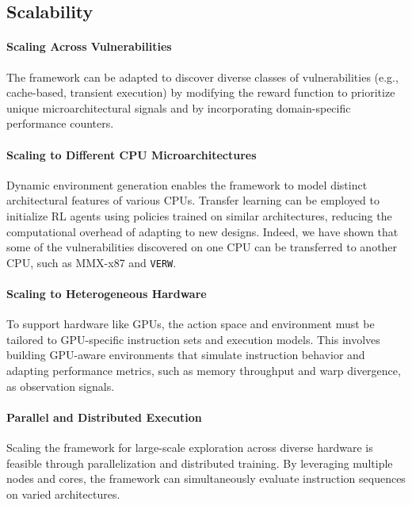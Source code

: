 \subsection{Scalability}


\paragraph{Scaling Across Vulnerabilities}
The framework can be adapted to discover diverse classes of vulnerabilities (e.g., cache-based, transient execution) by modifying the reward function to prioritize unique microarchitectural signals and by incorporating domain-specific performance counters.

\paragraph{Scaling to Different CPU Microarchitectures}
Dynamic environment generation enables the framework to model distinct architectural features of various CPUs. Transfer learning can be employed to initialize RL agents using policies trained on similar architectures, reducing the computational overhead of adapting to new designs. Indeed, we have shown that some of the vulnerabilities discovered on one CPU can be transferred to another CPU, such as MMX-x87 and \texttt{VERW}.

\paragraph{Scaling to Heterogeneous Hardware}
To support hardware like GPUs, the action space and environment must be tailored to GPU-specific instruction sets and execution models. This involves building GPU-aware environments that simulate instruction behavior and adapting performance metrics, such as memory throughput and warp divergence, as observation signals.

\paragraph{Parallel and Distributed Execution}
Scaling the framework for large-scale exploration across diverse hardware is feasible through parallelization and distributed training. By leveraging multiple nodes and cores, the framework can simultaneously evaluate instruction sequences on varied architectures.

